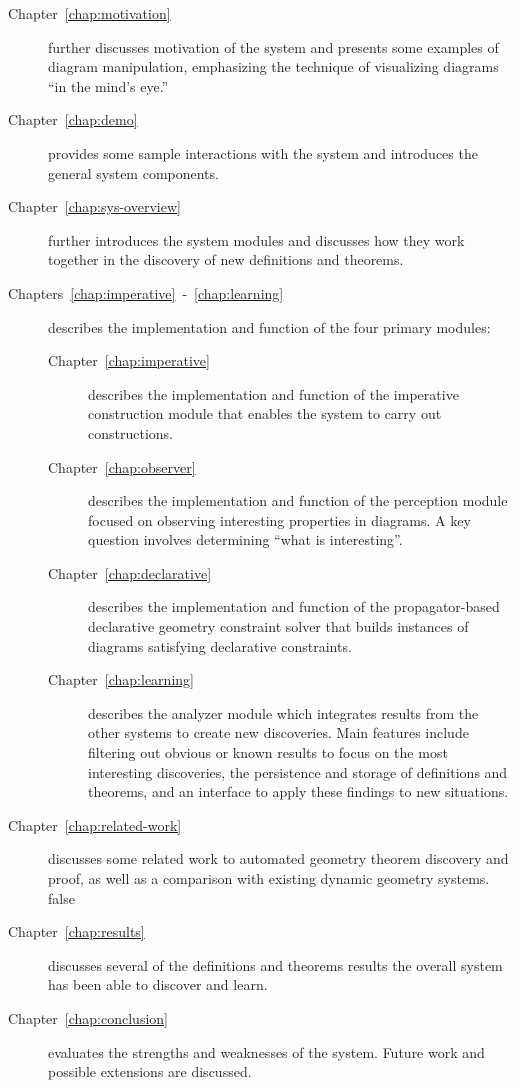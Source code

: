 \begin{description}

\item [Chapter~\ref{chap:motivation}] further discusses motivation of
  the system and presents some examples of diagram manipulation,
  emphasizing the technique of visualizing diagrams ``in the mind's
  eye.''

\item [Chapter~\ref{chap:demo}] provides some sample interactions with
  the system and introduces the general system components.

\item[Chapter~\ref{chap:sys-overview}] further introduces the system
  modules and discusses how they work together in the discovery of new
  definitions and theorems.

\item[Chapters~\ref{chap:imperative}~-~\ref{chap:learning}] describes
  the implementation and function of the four primary modules:

\begin{description}

\item[Chapter~\ref{chap:imperative}] describes the implementation
  and function of the imperative construction
  module that enables the system to carry out constructions.

\item[Chapter~\ref{chap:observer}] describes the implementation and
  function of the perception module focused on observing interesting
  properties in diagrams. A key question involves determining ``what
  is interesting''.

\item[Chapter~\ref{chap:declarative}] describes the implementation
  and function of the propagator-based declarative geometry constraint
  solver that builds instances of diagrams satisfying declarative
  constraints.

\item[Chapter~\ref{chap:learning}] describes the analyzer module which
  integrates results from the other systems to create new
  discoveries. Main features include filtering out obvious or known
  results to focus on the most interesting discoveries, the
  persistence and storage of definitions and theorems, and an
  interface to apply these findings to new situations.

\end{description}

\item[Chapter~\ref{chap:related-work}] discusses some related work to
  automated geometry theorem discovery and proof, as well as a
  comparison with existing dynamic geometry systems.
\if false
\item[Chapter~\ref{chap:results}] discusses several of the definitions
  and theorems results the overall system has been able to discover
  and learn.
\fi

\item[Chapter~\ref{chap:conclusion}] evaluates the strengths and
  weaknesses of the system. Future work and possible extensions are
  discussed.

\end{description}
